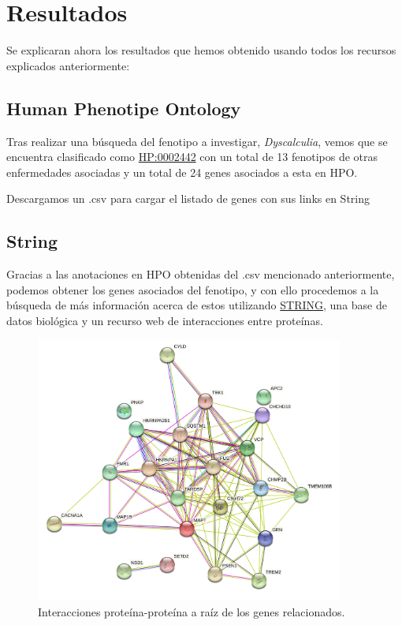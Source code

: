 \section{Resultados}

Se explicaran ahora los resultados que hemos obtenido usando todos los recursos explicados anteriormente:

\subsection{Human Phenotipe Ontology}

\hfill

Tras realizar una búsqueda del fenotipo a investigar, \textit{Dyscalculia}, vemos que se encuentra clasificado como \href{https://hpo.jax.org/app/browse/term/HP:0002442}{HP:0002442} con un total de 13 fenotipos de otras enfermedades asociadas y un total de 24 genes asociados a esta en HPO.

Descargamos un .csv para cargar el listado de genes con sus links en String

\subsection{String}

\hfill

Gracias a las anotaciones en HPO obtenidas del .csv mencionado anteriormente, podemos obtener los genes asociados del fenotipo, y con ello procedemos a la búsqueda de más información acerca de estos utilizando \href{https://string-db.org}{STRING}, una base de datos biológica y un recurso web de interacciones entre proteínas.

\begin{figure}[h]
	\centering
	\includegraphics[width=0.90\textwidth]{figures/Gene_Relationship.png}
	\caption{Interacciones proteína-proteína a raíz de los genes relacionados. }
	\label{fig:string1}
\end{figure}

